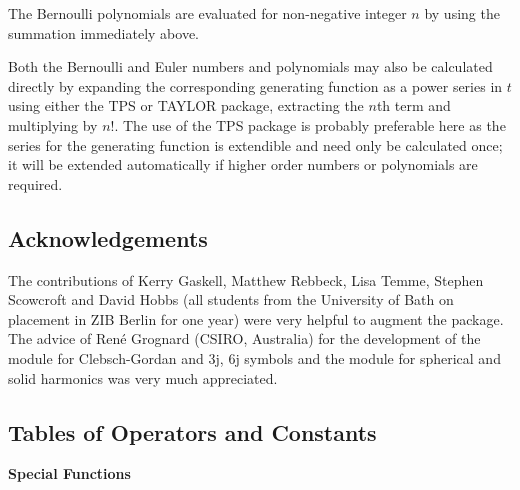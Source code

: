 The Bernoulli polynomials are evaluated for non-negative integer $n$ by using
the summation immediately above.

Both the Bernoulli and Euler numbers and polynomials may also be calculated
directly by expanding the corresponding generating function as a power
series in $t$ using either the TPS or TAYLOR package, extracting the $n$th term
and multiplying by $n!$. The use of the TPS package is probably preferable here
as the series for the generating function is extendible and need only be
calculated once; it will be extended automatically if higher order numbers or
polynomials are required.

\subsection{Acknowledgements}

The contributions of Kerry Gaskell, Matthew Rebbeck, Lisa Temme,
Stephen Scowcroft and David Hobbs (all students from the University of Bath
on placement in ZIB Berlin for one year) were very helpful
to augment the package. The advice of Ren\'e Grognard (CSIRO, Australia)
for the development of the module for Clebsch-Gordan and 3j, 6j symbols
and the module for spherical and solid harmonics was very much appreciated.
\newpage

\subsection{Tables of Operators and Constants}
\hypertarget{SPECFNTAB1}{}

\textbf{Special Functions}

